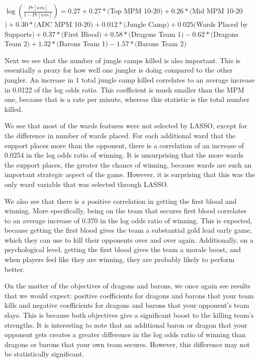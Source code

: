 \documentclass[runningheads]{llncs}
\begin{document}
	$\log(\frac{Pr[win]}{1 - Pr[win]}) = 0.27 + 0.27 * ($Top MPM 10-20$) + 0.26 * ($Mid MPM 10-20$) + 0.30 * ($ADC MPM 10-20$) + 0.012 * ($Jungle Camp$) + 0.025 ($Wards Placed by Supports$) + 0.37 * ($First Blood$) + 0.58 * ($Dragons Team 1$) - 0.62 * ($Dragons Team 2$) + 1.32 * ($Barons Team 1$) - 1.57 * ($Barons Team 2$)$
	
	
	Next we see that the number of jungle camps killed is also important. This is essentially a proxy for how well one jungler is doing compared to the other jungler. An increase in 1 total jungle camp killed correlates to an average increase in 0.0122 of the log odds ratio. This coefficient is much smaller than the MPM one, because that is a rate per minute, whereas this statistic is the total number killed.

	We see that most of the wards features were not selected by LASSO, except for the difference in number of wards placed. For each additional ward that the support places more than the opponent, there is a correlation of an increase of 0.0254 in the log odds ratio of winning. It is unsurprising that the more wards the support places, the greater the chance of winning, because wards are such an important strategic aspect of the game. However, it is surprising that this was the only ward variable that was selected through LASSO.

	We also see that there is a positive correlation in getting the first blood and winning. More specifically, being on the team that secures first blood correlates to an average increase of 0.370 in the log odds ratio of winning. This is expected, because getting the first blood gives the team a substantial gold lead early game, which they can use to kill their opponents over and over again. Additionally, on a psychological level, getting the first blood gives the team a morale boost, and when players feel like they are winning, they are probably likely to perform better.

	On the matter of the objectives of dragons and barons, we once again see results that we would expect: positive coefficients for dragons and barons that your team kills and negative coefficients for dragons and barons that your opponent’s team slays. This is because both objectives give a significant boost to the killing team’s strengths. It is interesting to note that an additional baron or dragon that your opponent gets creates a greater difference in the log odds ratio of winning than dragons or barons that your own team secures. However, this difference may not be statistically significant.
\end{document}
